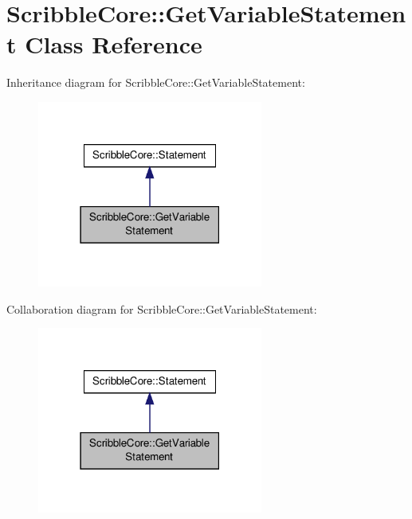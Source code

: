 \hypertarget{class_scribble_core_1_1_get_variable_statement}{\section{Scribble\-Core\-:\-:Get\-Variable\-Statement Class Reference}
\label{class_scribble_core_1_1_get_variable_statement}
}


Inheritance diagram for Scribble\-Core\-:\-:Get\-Variable\-Statement\-:\nopagebreak
\begin{figure}[H]
\begin{center}
\leavevmode
\includegraphics[width=210pt]{class_scribble_core_1_1_get_variable_statement__inherit__graph}
\end{center}
\end{figure}


Collaboration diagram for Scribble\-Core\-:\-:Get\-Variable\-Statement\-:\nopagebreak
\begin{figure}[H]
\begin{center}
\leavevmode
\includegraphics[width=210pt]{class_scribble_core_1_1_get_variable_statement__coll__graph}
\end{center}
\end{figure}
